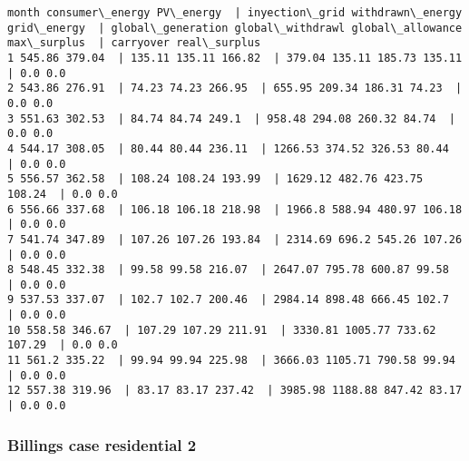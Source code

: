 \documentclass[11pt]{article}
\begin{document}
    \begin{Verbatim}[commandchars=\\\{\}]
month consumer\_energy PV\_energy  | inyection\_grid withdrawn\_energy grid\_energy  | global\_generation global\_withdrawl global\_allowance max\_surplus  | carryover real\_surplus
1 545.86 379.04  | 135.11 135.11 166.82  | 379.04 135.11 185.73 135.11  | 0.0 0.0
2 543.86 276.91  | 74.23 74.23 266.95  | 655.95 209.34 186.31 74.23  | 0.0 0.0
3 551.63 302.53  | 84.74 84.74 249.1  | 958.48 294.08 260.32 84.74  | 0.0 0.0
4 544.17 308.05  | 80.44 80.44 236.11  | 1266.53 374.52 326.53 80.44  | 0.0 0.0
5 556.57 362.58  | 108.24 108.24 193.99  | 1629.12 482.76 423.75 108.24  | 0.0 0.0
6 556.66 337.68  | 106.18 106.18 218.98  | 1966.8 588.94 480.97 106.18  | 0.0 0.0
7 541.74 347.89  | 107.26 107.26 193.84  | 2314.69 696.2 545.26 107.26  | 0.0 0.0
8 548.45 332.38  | 99.58 99.58 216.07  | 2647.07 795.78 600.87 99.58  | 0.0 0.0
9 537.53 337.07  | 102.7 102.7 200.46  | 2984.14 898.48 666.45 102.7  | 0.0 0.0
10 558.58 346.67  | 107.29 107.29 211.91  | 3330.81 1005.77 733.62 107.29  | 0.0 0.0
11 561.2 335.22  | 99.94 99.94 225.98  | 3666.03 1105.71 790.58 99.94  | 0.0 0.0
12 557.38 319.96  | 83.17 83.17 237.42  | 3985.98 1188.88 847.42 83.17  | 0.0 0.0

    \end{Verbatim}

    \hypertarget{billings-case-residential-2}{%
\subsubsection{Billings case residential
2}\label{billings-case-residential-2}}
\end{document}
